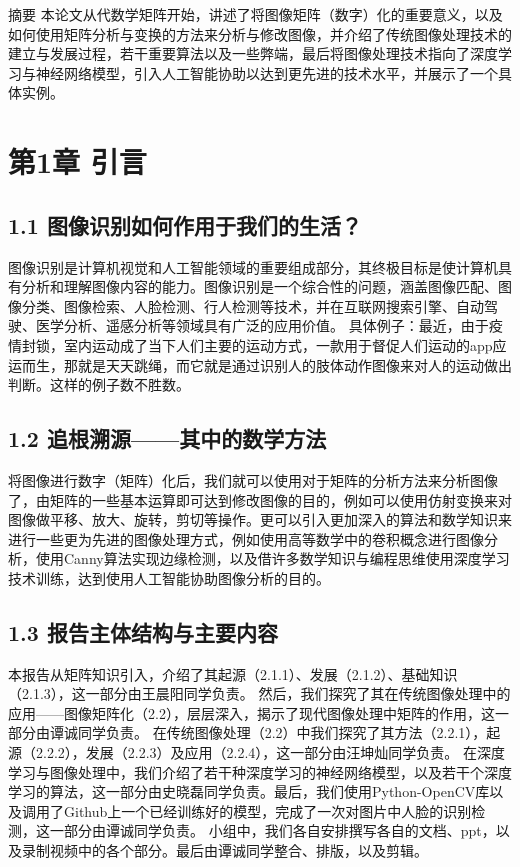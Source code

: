 摘要
本论文从代数学矩阵开始，讲述了将图像矩阵（数字）化的重要意义，以及如何使用矩阵分析与变换的方法来分析与修改图像，并介绍了传统图像处理技术的建立与发展过程，若干重要算法以及一些弊端，最后将图像处理技术指向了深度学习与神经网络模型，引入人工智能协助以达到更先进的技术水平，并展示了一个具体实例。

\section{第1章  引言}
\subsection{1.1 图像识别如何作用于我们的生活？}

	图像识别是计算机视觉和人工智能领域的重要组成部分，其终极目标是使计算机具有分析和理解图像内容的能力。图像识别是一个综合性的问题，涵盖图像匹配、图像分类、图像检索、人脸检测、行人检测等技术，并在互联网搜索引擎、自动驾驶、医学分析、遥感分析等领域具有广泛的应用价值。
具体例子：最近，由于疫情封锁，室内运动成了当下人们主要的运动方式，一款用于督促人们运动的app应运而生，那就是天天跳绳，而它就是通过识别人的肢体动作图像来对人的运动做出判断。这样的例子数不胜数。

\subsection{1.2 追根溯源——其中的数学方法}
	将图像进行数字（矩阵）化后，我们就可以使用对于矩阵的分析方法来分析图像了，由矩阵的一些基本运算即可达到修改图像的目的，例如可以使用仿射变换来对图像做平移、放大、旋转，剪切等操作。更可以引入更加深入的算法和数学知识来进行一些更为先进的图像处理方式，例如使用高等数学中的卷积概念进行图像分析，使用Canny算法实现边缘检测，以及借许多数学知识与编程思维使用深度学习技术训练，达到使用人工智能协助图像分析的目的。

\subsection{1.3 报告主体结构与主要内容}
	本报告从矩阵知识引入，介绍了其起源（2.1.1）、发展（2.1.2）、基础知识（2.1.3），这一部分由王晨阳同学负责。
然后，我们探究了其在传统图像处理中的应用——图像矩阵化（2.2），层层深入，揭示了现代图像处理中矩阵的作用，这一部分由谭诚同学负责。
在传统图像处理（2.2）中我们探究了其方法（2.2.1），起源（2.2.2），发展（2.2.3）及应用（2.2.4），这一部分由汪坤灿同学负责。
在深度学习与图像处理中，我们介绍了若干种深度学习的神经网络模型，以及若干个深度学习的算法，这一部分由史晓磊同学负责。最后，我们使用Python-OpenCV库以及调用了Github上一个已经训练好的模型，完成了一次对图片中人脸的识别检测，这一部分由谭诚同学负责。
小组中，我们各自安排撰写各自的文档、ppt，以及录制视频中的各个部分。最后由谭诚同学整合、排版，以及剪辑。
	 
